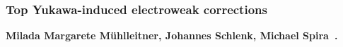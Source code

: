 \subsubsection{Top Yukawa-induced electroweak corrections}

\label{EW:Top-Higgs_sector}


\noindent \textbf{Milada Margarete Mühlleitner, Johannes Schlenk, Michael Spira~\cite{Muhlleitner:2022ijf}.}


